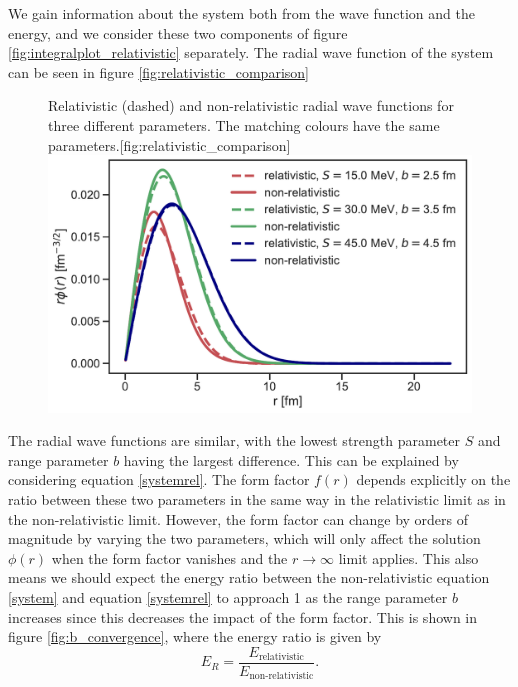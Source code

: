 We gain information about the system both from the wave function and the energy, and we consider these two components of figure \ref{fig:integralplot_relativistic} separately. The radial wave function of the system can be seen in figure \ref{fig:relativistic_comparison}
\begin{figure}[H]
	\begin{sidecaption}{Relativistic (dashed) and non-relativistic radial wave functions for three different parameters. The matching colours have the same parameters.}[fig:relativistic_comparison]
		\includegraphics[width=\linewidth]{Figures/rela_vs_nonrela_radial.pdf}
	\end{sidecaption}
\end{figure}
The radial wave functions are similar, with the lowest strength parameter $S$ and range parameter $b$ having the largest difference. This can be explained by considering equation \eqref{systemrel}. The form factor $f(r)$ depends explicitly on the ratio between these two parameters in the same way in the relativistic limit as in the non-relativistic limit. However, the form factor can change by orders of magnitude by varying the two parameters, which will only affect the solution $\phi(r)$ when the form factor vanishes and the $r\rightarrow \infty$ limit applies. This also means we should expect the energy ratio between the non-relativistic equation \eqref{system} and equation \eqref{systemrel} to approach 1 as the range parameter $b$ increases since this decreases the impact of the form factor. This is shown in figure \ref{fig:b_convergence}, where the energy ratio is given by
\begin{equation} \label{energyratio}
	E_R = \frac{E_\text{relativistic}}{E_\text{non-relativistic}}.
\end{equation}
